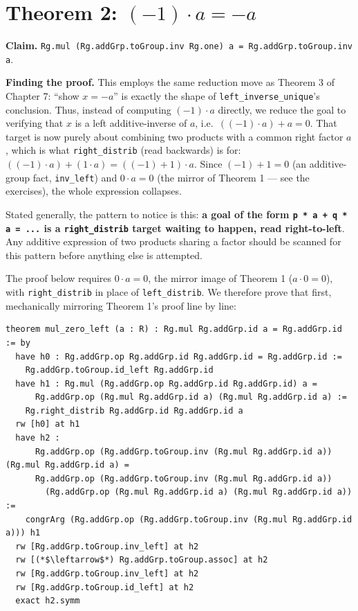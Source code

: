 \section{\texorpdfstring{Theorem 2: \((-1) \cdot a = -a\)}{Theorem 2: (-1) \textbackslash cdot a = -a}}\label{sec:09-ring-theorems:03-theorem-2:1}

\textbf{Claim.} \texttt{Rg.mul (Rg.addGrp.toGroup.inv Rg.one) a = Rg.addGrp.toGroup.inv a}.

\textbf{Finding the proof.} This employs the same reduction move as Theorem 3 of Chapter 7: ``show \(x = -a\)'' is exactly the shape of \texttt{left\_\allowbreak{}inverse\_\allowbreak{}unique}'s conclusion. Thus, instead of computing \((-1)\cdot a\) directly, we reduce the goal to verifying that \(x\) is a left additive-inverse of \(a\), i.e.~\(((-1)\cdot a) + a = 0\). That target is now purely about combining two products with a common right factor \(a\), which is what \texttt{right\_\allowbreak{}distrib} (read backwards) is for: \(((-1)\cdot a) + (1 \cdot a) = ((-1) + 1)\cdot a\). Since \((-1) + 1 = 0\) (an additive-group fact, \texttt{inv\_\allowbreak{}left}) and \(0 \cdot a = 0\) (the mirror of Theorem 1 --- see the exercises), the whole expression collapses.

Stated generally, the pattern to notice is this: \textbf{a goal of the form \texttt{p * a + q * a = ...} is a \texttt{right\_\allowbreak{}distrib} target waiting to happen, read right-to-left}. Any additive expression of two products sharing a factor should be scanned for this pattern before anything else is attempted.

The proof below requires \(0\cdot a = 0\), the mirror image of Theorem 1 (\(a\cdot 0 = 0\)), with \texttt{right\_\allowbreak{}distrib} in place of \texttt{left\_\allowbreak{}distrib}. We therefore prove that first, mechanically mirroring Theorem 1's proof line by line:

\begin{lstlisting}
theorem mul_zero_left (a : R) : Rg.mul Rg.addGrp.id a = Rg.addGrp.id := by
  have h0 : Rg.addGrp.op Rg.addGrp.id Rg.addGrp.id = Rg.addGrp.id :=
    Rg.addGrp.toGroup.id_left Rg.addGrp.id
  have h1 : Rg.mul (Rg.addGrp.op Rg.addGrp.id Rg.addGrp.id) a =
      Rg.addGrp.op (Rg.mul Rg.addGrp.id a) (Rg.mul Rg.addGrp.id a) :=
    Rg.right_distrib Rg.addGrp.id Rg.addGrp.id a
  rw [h0] at h1
  have h2 :
      Rg.addGrp.op (Rg.addGrp.toGroup.inv (Rg.mul Rg.addGrp.id a)) (Rg.mul Rg.addGrp.id a) =
      Rg.addGrp.op (Rg.addGrp.toGroup.inv (Rg.mul Rg.addGrp.id a))
        (Rg.addGrp.op (Rg.mul Rg.addGrp.id a) (Rg.mul Rg.addGrp.id a)) :=
    congrArg (Rg.addGrp.op (Rg.addGrp.toGroup.inv (Rg.mul Rg.addGrp.id a))) h1
  rw [Rg.addGrp.toGroup.inv_left] at h2
  rw [(*$\leftarrow$*) Rg.addGrp.toGroup.assoc] at h2
  rw [Rg.addGrp.toGroup.inv_left] at h2
  rw [Rg.addGrp.toGroup.id_left] at h2
  exact h2.symm
\end{lstlisting}

